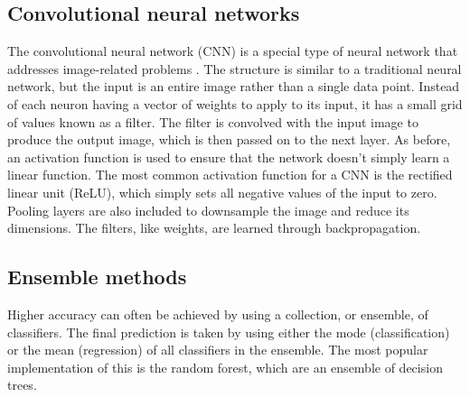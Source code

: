 \subsection{Convolutional neural networks}
The convolutional neural network (CNN) is a special type of neural network that addresses image-related problems \cite{lecun1999}.  The structure is similar to a traditional neural network, but the input is an entire image rather than a single data point. Instead of each neuron having a vector of weights to apply to its input, it has a small grid of values known as a filter.  The filter is convolved with the input image to produce the output image, which is then passed on to the next layer.  As before, an activation function is used to ensure that the network doesn't simply learn a linear function.  The most common activation function for a CNN is the rectified linear unit (ReLU), which simply sets all negative values of the input to zero.  Pooling layers are also included to downsample the image and reduce its dimensions.  The filters, like weights, are learned through backpropagation.

\subsection{Ensemble methods}
Higher accuracy can often be achieved by using a collection, or ensemble, of classifiers.  The final prediction is taken by using either the mode (classification) or the mean (regression) of all classifiers in the ensemble.  The most popular implementation of this is the random forest, which are an ensemble of decision trees.

